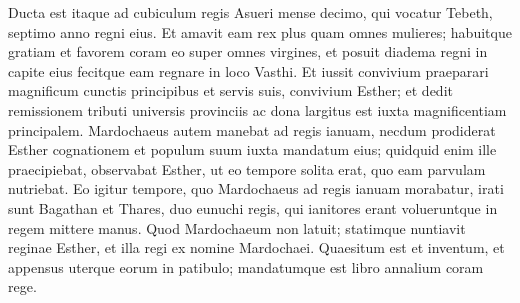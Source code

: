 \begin{biblechapter}
\begin{biblechapter}
\verse Ducta est itaque ad cubiculum regis Asueri mense decimo, qui vocatur Tebeth, septimo anno regni eius. 
\verse Et amavit eam rex plus quam omnes mulieres; habuitque gratiam et favorem coram eo super omnes virgines, et posuit diadema regni in capite eius fecitque eam regnare in loco Vasthi. 
\verse Et iussit convivium praeparari magnificum cunctis principibus et servis suis, convivium Esther; et dedit remissionem tributi universis provinciis ac dona largitus est iuxta magnificentiam principalem.
 \verse Mardochaeus autem manebat ad regis ianuam, 
\verse necdum prodiderat Esther cognationem et populum suum iuxta mandatum eius; quidquid enim ille praecipiebat, observabat Esther, ut eo tempore solita erat, quo eam parvulam nutriebat.
 \verse Eo igitur tempore, quo Mardochaeus ad regis ianuam morabatur, irati sunt Bagathan et Thares, duo eunuchi regis, qui ianitores erant volueruntque in regem mittere manus. 
\verse Quod Mardochaeum non latuit; statimque nuntiavit reginae Esther, et illa regi ex nomine Mardochaei. 
\verse Quaesitum est et inventum, et appensus uterque eorum in patibulo; mandatumque est libro annalium coram rege.
 

\end{biblechapter}
\end{biblechapter}
